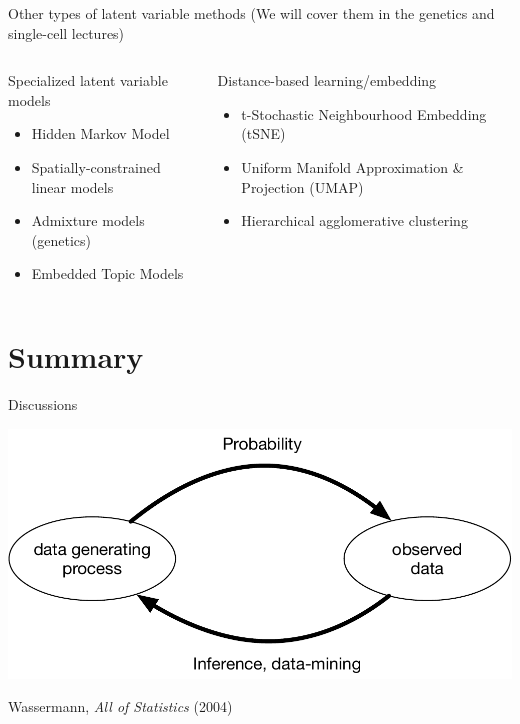 \documentclass[
  ignorenonframetext,
  aspectratio=169]{beamer}
\begin{document}
\begin{frame}{Other types of latent variable methods}
\protect\hypertarget{other-types-of-latent-variable-methods}{}
(We will cover them in the genetics and single-cell lectures)

\begin{columns}[T]
\begin{column}{.45\textwidth}
\begin{block}{Specialized latent variable models}
\protect\hypertarget{specialized-latent-variable-models}{}
\begin{itemize}
\item
  Hidden Markov Model
\item
  Spatially-constrained linear models
\item
  Admixture models (genetics)
\item
  Embedded Topic Models
\end{itemize}
\end{block}
\end{column}

\begin{column}{.45\textwidth}
\begin{block}{Distance-based learning/embedding}
\protect\hypertarget{distance-based-learningembedding}{}
\begin{itemize}
\item
  t-Stochastic Neighbourhood Embedding (tSNE)
\item
  Uniform Manifold Approximation \& Projection (UMAP)
\item
  Hierarchical agglomerative clustering
\end{itemize}
\end{block}
\end{column}
\end{columns}
\end{frame}

\hypertarget{summary}{%
\section{Summary}\label{summary}}

\begin{frame}{Discussions}
\protect\hypertarget{discussions}{}
\scriptsize

\begin{center}\includegraphics[width=.7\linewidth]{./Vis/unsupervised/model_based_inference} \end{center}

\normalsize

\vfill

\tiny

Wassermann, \emph{All of Statistics} (2004)
\end{frame}
\end{document}
